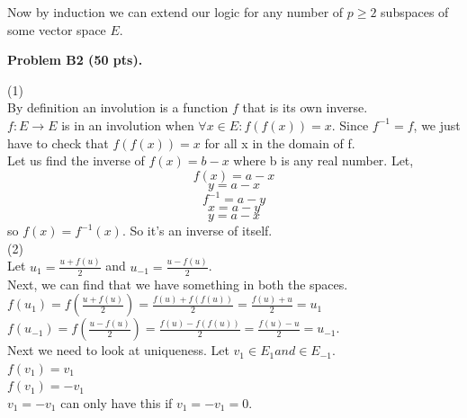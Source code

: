 \documentclass[12pt]{article}
\begin{document}
Now by induction we can extend our logic for any number of $p\geq 2$  subspaces of some vector space $E$. 



\vspace {0.25cm}\noindent
{\bf Problem B2 (50 pts).}

\medskip
(1)\\

By definition an involution is a function $f$ that is its own inverse. \\

$f: E \rightarrow E$ is in an involution when $\forall x \in E: f(f(x)) = x$. Since $f^{-1} = f$, we just have to check that $f(f(x)) =x$ for all x in the domain of f. \\

Let us find the inverse of $f(x) = b -x$ where b is any real number. Let,  
$$f(x) = a -x$$
$$y=a-x$$
$$f^{-1} = a - y $$
$$ x = a-y$$
$$y= a-x$$
so $f(x) = f^{-1}(x)$. So it's an inverse of itself. \\

\medskip
(2)\\

Let $u_1 = \frac{u + f(u)}{2}$ and $u_{-1} = \frac{u-f(u)}{2}$. \\

Next, we can find that we have something in both the spaces. 
$f(u_1) = f(\frac{u+f(u)}{2}) = \frac{f(u) + f(f(u))}{2} = \frac{f(u) + u}{2} = u_1$ \\
$f(u_{-1}) = f(\frac{u-f(u)}{2}) = \frac{f(u)-f(f(u))}{2} = \frac{f(u) - u}{2} = u_{-1}$. \\

Next we need to look at uniqueness. Let $v_1 \in E_1 and \in E_{-1}$. \\
$f(v_1) = v_1$ \\
$f(v_1) = -v_1$ \\
$v_1 = -v_1$ can only have this if $v_1 = -v_1 = 0$. 
\end{document}
